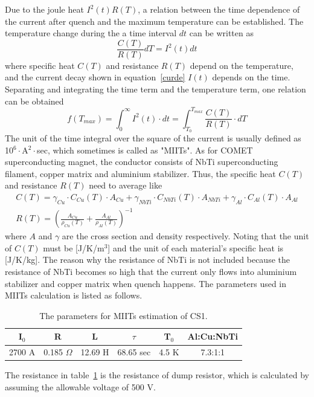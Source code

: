 Due to the joule heat $I^2(t)R(T)$, a relation between the time dependence of the current after quench and the maximum temperature can be established.
The temperature change during the a time interval $dt$ can be written as
\begin{equation}
 \frac{C(T)}{R(T)} dT = I^2(t) dt
\end{equation}
where specific heat $C(T)$ and resistance $R(T)$ depend on the temperature, and the current decay shown in equation~\ref{curde} $I(t)$ depends on the time.
Separating and integrating the time term and the temperature term, one relation can be obtained
\begin{equation}
 f(T_{max}) = \int^{\infty}_0 I^2(t) \cdot dt = \int^{T_{max}}_{T_0} \frac{C(T)}{R(T)} \cdot dT
\label{timeterm}
\end{equation}
The unit of the time integral over the square of the current is usually defined as 10$^6\cdot$A$^2\cdot$sec, which sometimes is called as "MIITs".
As for COMET superconducting magnet, the conductor consists of NbTi superconducting filament, copper matrix and aluminium stabilizer.
Thus, the specific heat $C(T)$ and resistance $R(T)$ need to average like
\begin{gather}
 C(T) = \gamma_{Cu} \cdot C_{Cu}(T) \cdot A_{Cu} + \gamma_{NbTi} \cdot C_{NbTi}(T) \cdot A_{NbTi} + \gamma_{Al} \cdot C_{Al}(T) \cdot A_{Al} \\
 R(T) = (\frac{A_{Cu}}{\rho_{Cu}(T)} + \frac{A_{Al}}{\rho_{Al}(T)})^{-1}
\end{gather}
where $A$ and $\gamma$ are the cross section and density respectively.
Noting that the unit of $C(T)$ must be [J/K/m$^3$] and the unit of each material's specific heat is [J/K/kg].
The reason why the resistance of NbTi is not included because the resistance of NbTi becomes so high that the current only flows into aluminium stabilizer and copper matrix when quench happens.
The parameters used in MIITs calculation is listed as follows.
\begin{table}[H]
 \centering
 \begin{tabular}{cccccc} \hline \hline
  I$_0$ & R & L & $\tau$ & T$_0$ & Al:Cu:NbTi \\ \hline
  2700 A & 0.185 $\Omega$ & 12.69 H & 68.65 sec & 4.5 K & 7.3:1:1 \\ \hline \hline
 \end{tabular}
 \caption{The parameters for MIITs estimation of CS1.}
 \label{miitspara}
\end{table}
The resistance in table~\ref{miitspara} is the resistance of dump resistor, which is calculated by assuming the allowable voltage of 500 V.
